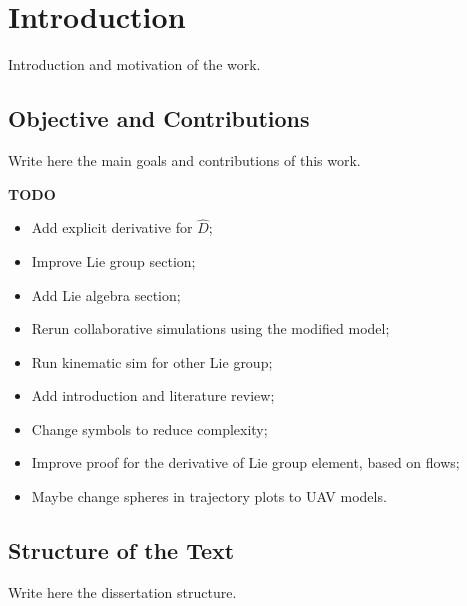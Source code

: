 \chapter{Introduction}\label{chap:Intro}

Introduction and motivation of the work.

\section{Objective and Contributions}

Write here the main goals and contributions of this work.

\textbf{TODO}
\begin{itemize}
    \item Add explicit derivative for $\widehat{D}$;
    \item Improve Lie group section;
    \item Add Lie algebra section;
    \item Rerun collaborative simulations using the modified model;
    \item Run kinematic sim for other Lie group;
    \item Add introduction and literature review;
    \item Change symbols to reduce complexity;
    \item Improve proof for the derivative of Lie group element, based on flows;
    \item Maybe change spheres in trajectory plots to UAV models.
\end{itemize}

\section{Structure of the Text}

Write here the dissertation structure.
